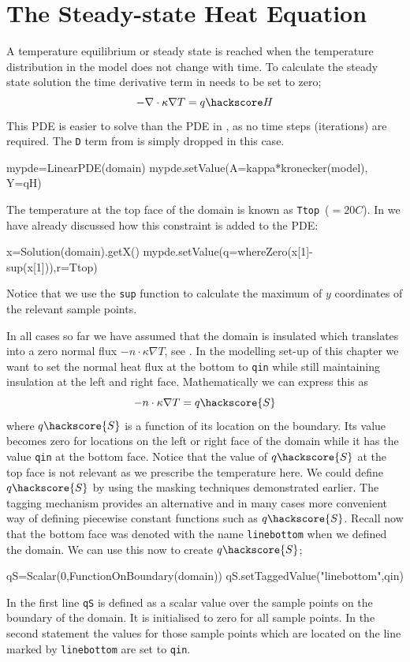 \section{The Steady-state Heat Equation}
A temperature equilibrium or steady state is reached when the temperature
distribution in the model does not change with time. To calculate the steady
state solution the time derivative term in  needs to be
set to zero;
\begin{equation}\label{eqn:Tform nabla steady}
-\nabla \cdot \kappa \nabla T = q\hackscore H
\end{equation}
This PDE is easier to solve than the PDE in , as no time
steps (iterations) are required. The \verb|D| term from  is
simply dropped in this case.
\begin{python}
mypde=LinearPDE(domain)
mypde.setValue(A=kappa*kronecker(model), Y=qH)
\end{python}
The temperature at the top face of the domain is known as \verb|Ttop|~($=20 C$).
In  we have already discussed how this constraint is added
to the PDE:
\begin{python}
x=Solution(domain).getX()
mypde.setValue(q=whereZero(x[1]-sup(x[1])),r=Ttop)
\end{python}
Notice that we use the \verb|sup| function to calculate the maximum of $y$
coordinates of the relevant sample points.

In all cases so far we have assumed that the domain is insulated which
translates into a zero normal flux $-n \cdot \kappa \nabla T$, see
. In the modelling set-up of this chapter we want to set
the normal heat flux at the bottom to \verb|qin| while still maintaining
insulation at the left and right face. Mathematically we can express this as
\begin{equation}
-n \cdot \kappa \nabla T = q\hackscore{S}
\label{eq:inhom flux}
\end{equation}
where $q\hackscore{S}$ is a function of its location on the boundary. Its value
becomes zero for locations on the left or right face of the domain while it has
the value \verb|qin| at the bottom face.
Notice that the value of $q\hackscore{S}$ at the top face is not relevant as we
prescribe the temperature here.
We could define $q\hackscore{S}$ by using the masking techniques demonstrated
earlier. The tagging mechanism provides an alternative and in many cases more
convenient way of defining piecewise constant functions such as
$q\hackscore{S}$. Recall now that the bottom face was denoted with the name
\verb|linebottom| when we defined the domain.
We can use this now to create $q\hackscore{S}$;
\begin{python}
qS=Scalar(0,FunctionOnBoundary(domain))
qS.setTaggedValue("linebottom",qin)
\end{python}
In the first line \verb|qS| is defined as a scalar value over the sample points
on the boundary of the domain. It is initialised to zero for all sample points.
In the second statement the values for those sample points which are located on
the line marked by \verb|linebottom| are set to \verb|qin|. 

